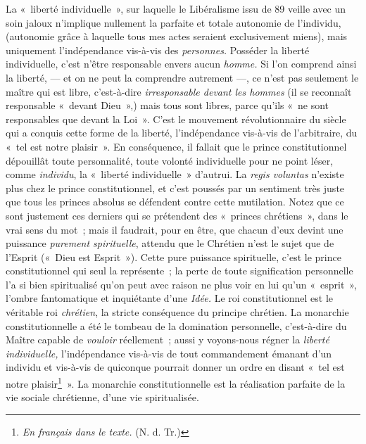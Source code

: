 \documentclass[french,twoside]{book} %
\begin{document}
 La « liberté individuelle », sur laquelle le Libéralisme issu de 89 veille avec un soin jaloux n’implique nullement la parfaite et totale autonomie de l’individu, (autonomie grâce à laquelle tous mes actes seraient exclusivement miens), mais uniquement l’indépendance vis-à-vis des \emph{personnes.} Posséder la liberté individuelle, c’est n’être responsable envers aucun \emph{homme.} Si l’on comprend ainsi la liberté, — et on ne peut la comprendre autrement —, ce n’est pas seulement le maître qui est libre, c’est-à-dire \emph{irresponsable devant les hommes} (il se reconnaît responsable « devant Dieu »,) mais tous sont libres, parce qu’ils « ne sont responsables que devant la Loi ». C’est le mouvement révolutionnaire du siècle qui a conquis cette forme de la liberté, l’indépendance vis-à-vis de l’arbitraire, du « tel est notre plaisir ». En conséquence, il fallait que le prince constitutionnel dépouillât toute personnalité, toute volonté individuelle pour ne point léser, comme \emph{individu}, la « liberté individuelle » d’autrui. La \emph{regis voluntas} n’existe plus chez le prince constitutionnel, et c’est poussés par un sentiment très juste que tous les princes absolus se défendent contre cette mutilation. Notez que ce sont justement ces derniers qui se prétendent des « princes chrétiens », dans le vrai sens du mot ; mais il faudrait, pour en être, que chacun d’eux devint une puissance \emph{purement spirituelle}, attendu que le Chrétien n’est le sujet que de l’Esprit (« Dieu est Esprit »). Cette pure puissance spirituelle, c’est le prince constitutionnel qui seul la représente ; la perte de toute signification personnelle l’a si bien spiritualisé qu’on peut avec raison ne plus voir en lui qu’un « esprit », l’ombre fantomatique et inquiétante d’une \emph{Idée.} Le roi constitutionnel est le véritable roi \emph{chrétien}, la stricte conséquence du principe chrétien. La monarchie constitutionnelle a été le tombeau de la domination personnelle, c’est-à-dire du Maître capable de \emph{vouloir }réellement ; aussi y voyons-nous régner la \emph{liberté individuelle, } l’indépendance vis-à-vis de tout commandement émanant d’un individu et vis-à-vis de quiconque pourrait donner un ordre en disant « tel est notre plaisir\footnote{ \noindent \emph{En français dans le texte.} (N. d. Tr.)
 } ». La monarchie constitutionnelle est la réalisation parfaite de la vie sociale chrétienne, d’une vie spiritualisée.\par
\end{document}
